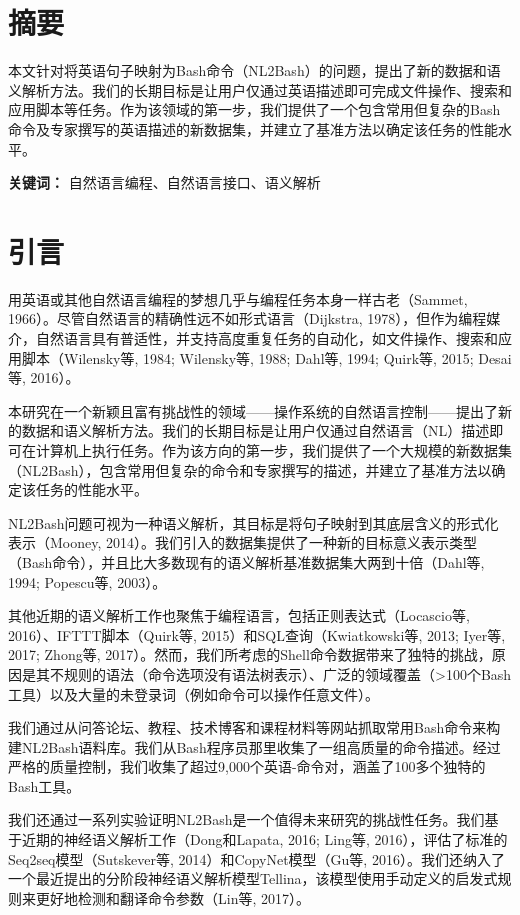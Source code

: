 \thesistranslationchinese

\section{摘要}

本文针对将英语句子映射为Bash命令（NL2Bash）的问题，提出了新的数据和语义解析方法。我们的长期目标是让用户仅通过英语描述即可完成文件操作、搜索和应用脚本等任务。作为该领域的第一步，我们提供了一个包含常用但复杂的Bash命令及专家撰写的英语描述的新数据集，并建立了基准方法以确定该任务的性能水平。

\textbf{关键词：} 自然语言编程、自然语言接口、语义解析

\section{引言}

用英语或其他自然语言编程的梦想几乎与编程任务本身一样古老（Sammet, 1966）。尽管自然语言的精确性远不如形式语言（Dijkstra, 1978），但作为编程媒介，自然语言具有普适性，并支持高度重复任务的自动化，如文件操作、搜索和应用脚本（Wilensky等, 1984; Wilensky等, 1988; Dahl等, 1994; Quirk等, 2015; Desai等, 2016）。

本研究在一个新颖且富有挑战性的领域——操作系统的自然语言控制——提出了新的数据和语义解析方法。我们的长期目标是让用户仅通过自然语言（NL）描述即可在计算机上执行任务。作为该方向的第一步，我们提供了一个大规模的新数据集（NL2Bash），包含常用但复杂的命令和专家撰写的描述，并建立了基准方法以确定该任务的性能水平。

NL2Bash问题可视为一种语义解析，其目标是将句子映射到其底层含义的形式化表示（Mooney, 2014）。我们引入的数据集提供了一种新的目标意义表示类型（Bash命令），并且比大多数现有的语义解析基准数据集大两到十倍（Dahl等, 1994; Popescu等, 2003）。

其他近期的语义解析工作也聚焦于编程语言，包括正则表达式（Locascio等, 2016）、IFTTT脚本（Quirk等, 2015）和SQL查询（Kwiatkowski等, 2013; Iyer等, 2017; Zhong等, 2017）。然而，我们所考虑的Shell命令数据带来了独特的挑战，原因是其不规则的语法（命令选项没有语法树表示）、广泛的领域覆盖（>100个Bash工具）以及大量的未登录词（例如命令可以操作任意文件）。

我们通过从问答论坛、教程、技术博客和课程材料等网站抓取常用Bash命令来构建NL2Bash语料库。我们从Bash程序员那里收集了一组高质量的命令描述。经过严格的质量控制，我们收集了超过9,000个英语-命令对，涵盖了100多个独特的Bash工具。

我们还通过一系列实验证明NL2Bash是一个值得未来研究的挑战性任务。我们基于近期的神经语义解析工作（Dong和Lapata, 2016; Ling等, 2016），评估了标准的Seq2seq模型（Sutskever等, 2014）和CopyNet模型（Gu等, 2016）。我们还纳入了一个最近提出的分阶段神经语义解析模型Tellina，该模型使用手动定义的启发式规则来更好地检测和翻译命令参数（Lin等, 2017）。

